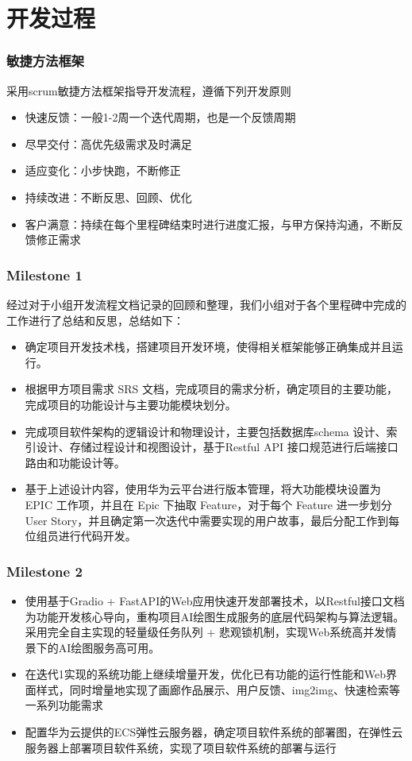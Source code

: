 \section{开发过程}
\begin{frame}
    \frametitle{敏捷方法框架}
    采用scrum敏捷方法框架指导开发流程，遵循下列开发原则
    \begin{itemize}
        \item 快速反馈：一般1-2周一个迭代周期，也是一个反馈周期
        \item 尽早交付：高优先级需求及时满足
        \item 适应变化：小步快跑，不断修正
        \item 持续改进：不断反思、回顾、优化
        \item 客户满意：持续在每个里程碑结束时进行进度汇报，与甲方保持沟通，不断反馈修正需求
    \end{itemize}
\end{frame}

\begin{frame}
    \frametitle{Milestone 1}
    经过对于小组开发流程文档记录的回顾和整理，我们小组对于各个里程碑中完成的工作进行了总结和反思，总结如下：
    \begin{itemize}
        \item 确定项目开发技术栈，搭建项目开发环境，使得相关框架能够正确集成并且运行。
        \item 根据甲方项目需求 SRS 文档，完成项目的需求分析，确定项目的主要功能，完成项目的功能设计与主要功能模块划分。
        \item 完成项目软件架构的逻辑设计和物理设计，主要包括数据库schema 设计、索引设计、存储过程设计和视图设计，基于Restful API 接口规范进行后端接口路由和功能设计等。
        \item 基于上述设计内容，使用华为云平台进行版本管理，将大功能模块设置为 EPIC 工作项，并且在 Epic 下抽取 Feature，对于每个 Feature 进一步划分 User Story，并且确定第一次迭代中需要实现的用户故事，最后分配工作到每位组员进行代码开发。
    \end{itemize}
\end{frame}

\begin{frame}
    \frametitle{Milestone 2}
    \begin{itemize}
        \item 使用基于Gradio + FastAPI的Web应用快速开发部署技术，以Restful接口文档为功能开发核心导向，重构项目AI绘图生成服务的底层代码架构与算法逻辑。采用完全自主实现的轻量级任务队列 + 悲观锁机制，实现Web系统高并发情景下的AI绘图服务高可用。
        \item 在迭代1实现的系统功能上继续增量开发，优化已有功能的运行性能和Web界面样式，同时增量地实现了画廊作品展示、用户反馈、img2img、快速检索等一系列功能需求
        \item 配置华为云提供的ECS弹性云服务器，确定项目软件系统的部署图，在弹性云服务器上部署项目软件系统，实现了项目软件系统的部署与运行
    \end{itemize}
\end{frame}

